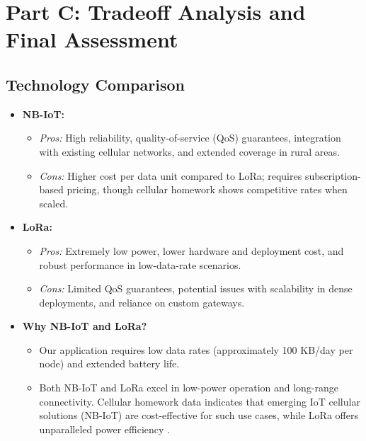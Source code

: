 \section{Part C: Tradeoff Analysis and Final Assessment}
\subsection{Technology Comparison}
\begin{itemize}
    \item \textbf{NB-IoT:}
    \begin{itemize}
        \item \textit{Pros:} High reliability, quality-of-service (QoS) guarantees, integration with existing cellular networks, and extended coverage in rural areas.
        \item \textit{Cons:} Higher cost per data unit compared to LoRa; requires subscription-based pricing, though cellular homework shows competitive rates when scaled.
    \end{itemize}
    \item \textbf{LoRa:}
    \begin{itemize}
        \item \textit{Pros:} Extremely low power, lower hardware and deployment cost, and robust performance in low-data-rate scenarios.
        \item \textit{Cons:} Limited QoS guarantees, potential issues with scalability in dense deployments, and reliance on custom gateways.
    \end{itemize}
    \item \textbf{Why NB-IoT and LoRa?} 
    \begin{itemize}
        \item Our application requires low data rates (approximately 100 KB/day per node) and extended battery life.
        \item Both NB-IoT and LoRa excel in low-power operation and long-range connectivity. Cellular homework data indicates that emerging IoT cellular solutions (NB-IoT) are cost-effective for such use cases, while LoRa offers unparalleled power efficiency \cite{jio2022iot, telcel2022network}.
    \end{itemize}
\end{itemize}

